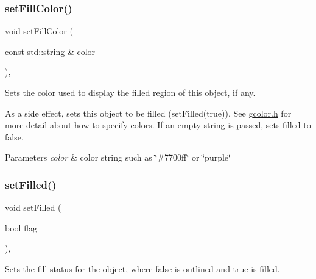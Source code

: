 \subsubsection{\texorpdfstring{set\+Fill\+Color()}{setFillColor()}\hspace{0.1cm}{\footnotesize\ttfamily [3/3]}}
{\footnotesize\ttfamily void set\+Fill\+Color (\begin{DoxyParamCaption}\item[{const std\+::string \&}]{color }\end{DoxyParamCaption})\hspace{0.3cm}{\ttfamily [virtual]}, {\ttfamily [inherited]}}



Sets the color used to display the filled region of this object, if any. 

As a side effect, sets this object to be filled (set\+Filled(true)). See \mbox{\hyperlink{gcolor_8h_source}{gcolor.\+h}} for more detail about how to specify colors. If an empty string is passed, sets filled to false.


\begin{DoxyParams}{Parameters}
{\em color} & color string such as \char`\"{}\#7700ff\char`\"{} or \char`\"{}purple\char`\"{} \\
\hline
\end{DoxyParams}
\mbox{\label{classsgl_1_1GObject_a9b82b53362282c6bb7d6947068d2e55b}} 
\subsubsection{\texorpdfstring{set\+Filled()}{setFilled()}}
{\footnotesize\ttfamily void set\+Filled (\begin{DoxyParamCaption}\item[{bool}]{flag }\end{DoxyParamCaption})\hspace{0.3cm}{\ttfamily [virtual]}, {\ttfamily [inherited]}}



Sets the fill status for the object, where {\ttfamily false} is outlined and {\ttfamily true} is filled. 

\mbox{\label{classsgl_1_1GObject_a2592348886ffea646c6534bf88f7c49d}} 
